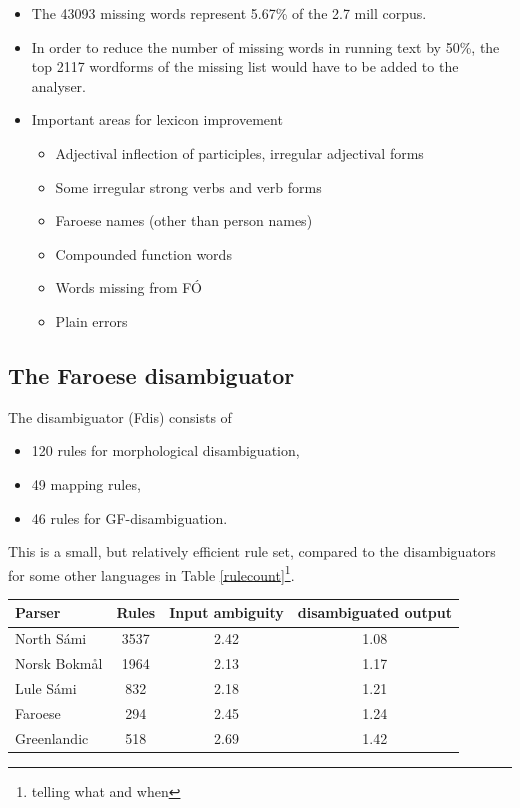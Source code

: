 \documentclass{article}
\begin{document}
\begin{itemize}
\item The 43093 missing words represent 5.67\% of the 2.7 mill corpus. 
\item In order to reduce the number of missing words in running text by 50\%, the top 2117 wordforms of the missing list would have to be added to the analyser. \\ 
\item Important areas for lexicon improvement
\begin{itemize}
\item Adjectival inflection of participles, irregular adjectival forms
\item Some irregular strong verbs and verb forms
\item Faroese names (other than person names)
\item Compounded function words
\item Words missing from FÓ
\item Plain errors
\end{itemize}



\end{itemize}\subsection{The Faroese disambiguator}

The disambiguator (Fdis) consists of

\begin{itemize} 
\item 120 rules for morphological disambiguation, 
\item 49 mapping rules, 
\item 46 rules for GF-disambiguation. 
\end{itemize}

This is a small, but relatively efficient rule set, compared to the disambiguators for some other languages in Table \ref{rulecount}\footnote{telling what and when}.

\begin{table}[htdp]
\begin{center}
\begin{tabular}{|l|c|c|c|}
\hline
Parser & Rules & Input ambiguity & disambiguated output \\
\hline
North Sámi	  & 3537 & 2.42 & 1.08 \\
Norsk Bokmål  & 1964 & 2.13 & 1.17 \\
Lule Sámi	  &  832 & 2.18 & 1.21 \\
Faroese		  &  294 & 2.45 & 1.24 \\
Greenlandic	  &  518 & 2.69 & 1.42 \\
\hline
\end{tabular}
\end{center}
\label{Rules and results for som CG parsers}
\end{table}%
\end{document}
